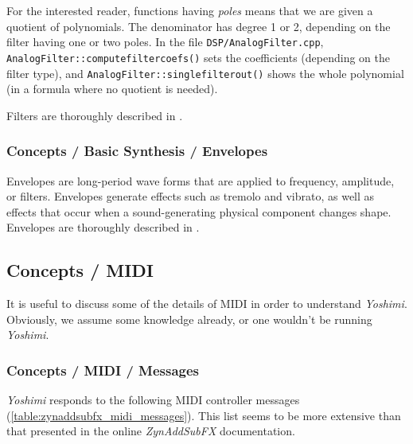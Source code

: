    For the interested reader, functions having \textsl{poles}
   means that we are given a quotient of polynomials. The denominator has
   degree 1 or 2, depending on the filter having one or two poles. In the
   file \texttt{DSP/AnalogFilter.cpp},
   \texttt{AnalogFilter::computefiltercoefs()} sets the coefficients
   (depending on the filter type), and
   \texttt{AnalogFilter::singlefilterout()} shows the whole polynomial (in a
   formula where no quotient is needed).

   Filters are thoroughly described in
   .

\subsubsection{Concepts / Basic Synthesis / Envelopes}
\label{subsubsec:concepts_basics_envelopes}

   Envelopes are long-period wave forms that are applied to frequency,
   amplitude, or filters.  Envelopes generate effects such as tremolo and
   vibrato, as well as effects that occur when a sound-generating physical
   component changes shape.
   Envelopes are thoroughly described in
   .

\subsection{Concepts / MIDI}
\label{subsec:concepts_midi}

   It is useful to discuss some of the details of MIDI in order
   to understand \textsl{Yoshimi}.  Obviously, we assume
   some knowledge already, or one wouldn't be running
   \textsl{Yoshimi}.

\subsubsection{Concepts / MIDI / Messages}
\label{subsubsec:concepts_midi_messages}

   \textsl{Yoshimi} responds to the following MIDI controller messages
   (\ref{table:zynaddsubfx_midi_messages}).
   This list seems to be more extensive than that presented in the
   online \textsl{ZynAddSubFX} documentation.

